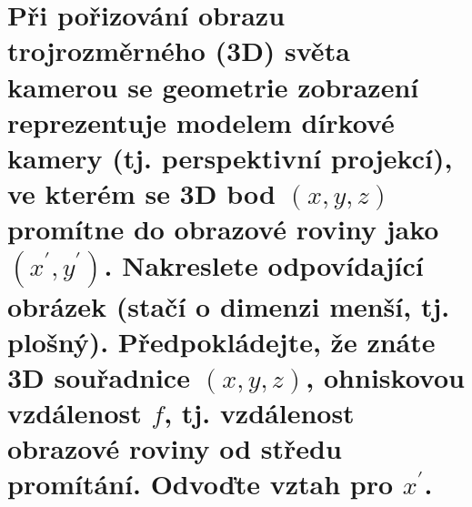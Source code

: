 \section{Při pořizování obrazu trojrozměrného (3D) světa kamerou se geometrie zobrazení reprezentuje modelem dírkové 
kamery (tj. perspektivní projekcí), ve kterém se 3D bod $(x,y,z)$ promítne do obrazové roviny jako 
$(x^{\prime},y^{\prime})$. Nakreslete odpovídající obrázek (stačí o dimenzi menší, tj. plošný). Předpokládejte, že znáte 
3D souřadnice $(x,y,z)$, ohniskovou vzdálenost $f$, tj. vzdálenost obrazové roviny od středu promítání. Odvoďte vztah 
pro $x^{\prime}$.}